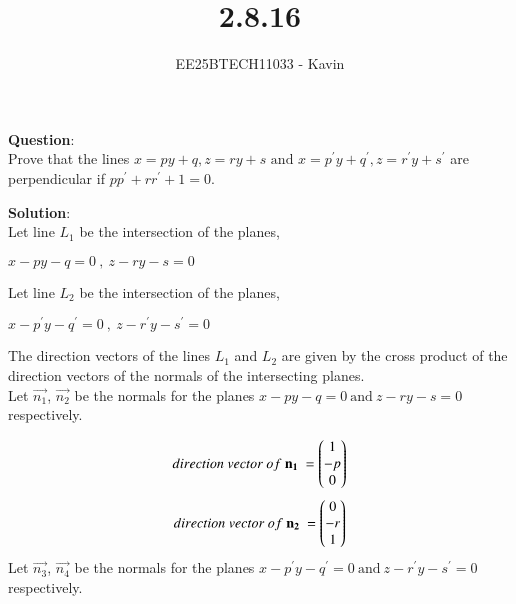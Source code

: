 \documentclass[journal]{IEEEtran}
\begin{document}

\vspace{3cm}

\title{2.8.16}
\author{EE25BTECH11033 - Kavin}
{\let\newpage\relax\maketitle}

\renewcommand{\thefigure}{\theenumi}
\renewcommand{\thetable}{\theenumi}
\setlength{\intextsep}{10pt} %
\textbf{Question}:\\
Prove that the lines $x=py+q , z=ry+s \text{ and } x=p^{\prime}y+q^{\prime}, z=r^{\prime}y+s^{\prime} $ are perpendicular if $pp^{\prime}+rr^{\prime}+1=0$.\\
\bigskip

\textbf{Solution}:\\
Let line $L_1$ be the intersection of the planes,
\begin{center}
    $x-py-q=0\ ,\ z-ry-s=0$
\end{center}
Let line $L_2$ be the intersection of the planes,
\begin{center}
    $x-p^{\prime}y-q^{\prime}=0\ ,\ z-r^{\prime}y-s^{\prime}=0$
\end{center}
\bigskip
The direction vectors of the lines $L_1$ and $L_2$ are given by the cross product of the direction vectors of the normals of the intersecting planes.\\ 
Let $\vec{n_1}$, $\vec{n_2}$ be the normals for the planes $x-py-q=0\ \text{and}\ z-ry-s=0$ respectively.

\begin{align}
    direction\ vector\ of\ \mathbf{n_1}\ = \begin{pmatrix}1\\-p\\0\end{pmatrix}
\end{align}
\begin{align}
    direction\ vector\ of\ \mathbf{n_2}\ = \begin{pmatrix}0\\-r\\1\end{pmatrix}
\end{align}
Let $\vec{n_3}$, $\vec{n_4}$ be the normals for the planes $x-p^{\prime}y-q^{\prime}=0\ \text{and}\ z-r^{\prime}y-s^{\prime}=0$ respectively.
\end{document}
